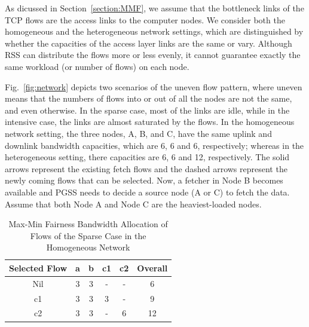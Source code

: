 \documentclass[10pt,journal,compsoc]{IEEEtran}
\begin{document}
As dicussed in Section~\ref{section:MMF}, we assume that the bottleneck links of the TCP
flows are the access links to the computer nodes.
We consider both the homogeneous and the heterogeneous network settings,
which are distinguished by whether the capacities
of the access layer links are the same or vary.
Although RSS can distribute the
flows more or less evenly, %
it cannot guarantee exactly the same workload (or number of flows) on each node. 



Fig.~\ref{fig:network} depicts 
two scenarios of the uneven flow pattern, where uneven means
that the numbers of flows into or out of all the nodes are not the same, and even otherwise. 
In the sparse case, most of the links are idle, while in the intensive case, the
links are almost saturated by the flows.
In the homogeneous network setting,
the three nodes, A, B, and C, have the same uplink and downlink bandwidth
capacities, %
which are 6, 6 and 6, respectively; whereas in the heterogeneous setting,
there capacities are 6, 6 and 12, respectively.
The solid arrows represent the existing fetch flows and the dashed arrows represent the newly coming flows that can be selected. 
Now, a fetcher in Node B becomes available and PGSS needs to decide a source
node (A or C) to fetch the data. 
Assume that both Node A and Node C are the heaviest-loaded nodes.



\begin{table}[!t]
\renewcommand{\arraystretch}{1}
\caption{Max-Min Fairness Bandwidth Allocation of Flows of the Sparse Case in the Homogeneous Network}
\label{table:homoSparse}
\centering
\begin{tabularx}{.35\textwidth}{c||c|c|c|c|c}
\hline
\textbf{Selected Flow} & \textbf{a} & \textbf{b} & \textbf{c1} & \textbf{c2} & \textbf{Overall}\\
\hline
Nil &3&3&-&-&6\\
\hline
c1 &3&3&3&-&9\\
\hline
c2 &3&3&-&6&12\\
\hline
\end{tabularx}
\end{table}
\end{document}
